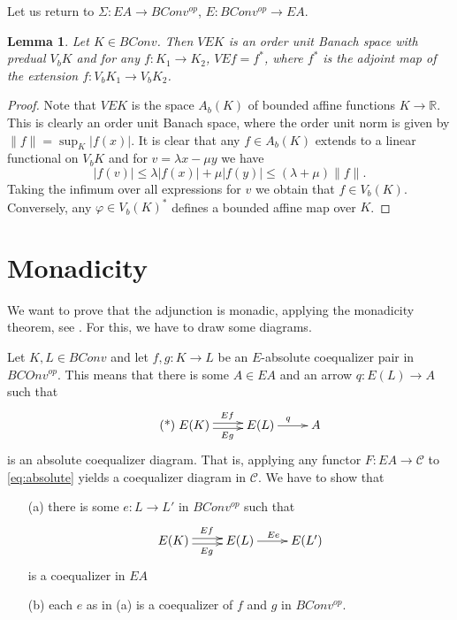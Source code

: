 \documentclass[12pt]{article}
\newtheorem{lemma}{Lemma}
\newcommand{\<}{\langle}
\begin{document}
Let us return to  $\Sigma: EA\to BConv^{op}$, $E:BConv^{op}\to EA$.

\begin{lemma}\label{lemma:bas} Let $K\in BConv$. Then $VEK$ is an order unit Banach space with predual $V_bK$ and for any $f: K_1\to K_2$,
 $VEf=f^*$, where $f^*$ is the adjoint map of the extension  $f: V_bK_1\to V_bK_2$.

\end{lemma}

\begin{proof} Note that $VEK$ is the space $A_b(K)$ of bounded affine functions $K\to \mathbb R$. This is clearly an order unit Banach space, where the order unit norm is given by $\|f\|=\sup_K|f(x)|$. It is clear that any $f\in A_b(K)$ 
extends to a linear functional on $V_bK$ and for $v=\lambda x-\mu y$ we have
\[
|f(v)|\le \lambda|f(x)|+\mu|f(y)|\le (\lambda+\mu)\|f\|.
\]
Taking the infimum over all expressions for $v$ we obtain that $f\in V_b(K)$. Conversely, any $\varphi\in V_b(K)^*$ defines a 
 bounded affine map over $K$.

\end{proof}

\section{Monadicity}

We want to prove that the adjunction is monadic, applying the monadicity theorem, see \cite{leinster}. For this, we have to draw some diagrams.

Let $K,L\in BConv$ and let $f,g:K\to L$ be an $E$-absolute coequalizer pair in $BCOnv^{op}$. This means that there is some $A\in EA$ and an arrow $q:E(L)\to A$ such that
\begin{equation}\label{eq:absolute}\tag{*}
\xymatrix{
E(K) \ar@<.5ex>[r]^{Ef} \ar@<-.5ex>[r]_{Eg} &E(L)\ar[r]^q & A}
\end{equation}
is an absolute coequalizer diagram. That is, applying any functor $F: EA\to \mathcal C$ to \eqref{eq:absolute} yields a coequalizer diagram in $\mathcal C$. We have to show that
\begin{enumerate}
\item[(a)] there is some $e: L\to L'$ in $BConv^{op}$ such that 
\begin{equation}
\xymatrix{
E(K) \ar@<.5ex>[r]^{Ef} \ar@<-.5ex>[r]_{Eg} &E(L)\ar[r]^{Ee} & E(L')}
\end{equation}
is a coequalizer in $EA$
\item[(b)] each $e$ as in (a) is a coequalizer of $f$ and $g$ in $BConv^{op}$.
\end{enumerate}
\end{document}
